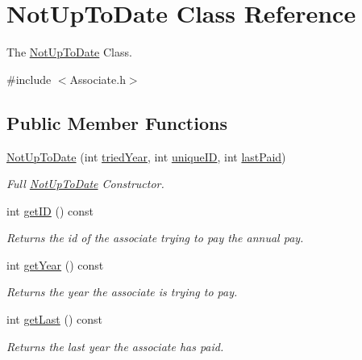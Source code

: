 \hypertarget{classNotUpToDate}{}\section{Not\+Up\+To\+Date Class Reference}
\label{classNotUpToDate}


The \hyperlink{classNotUpToDate}{Not\+Up\+To\+Date} Class.  




{\ttfamily \#include $<$Associate.\+h$>$}

\subsection*{Public Member Functions}
\begin{DoxyCompactItemize}
\item 
\hyperlink{classNotUpToDate_a61d903e6816ad8d5f5b496a72047df45}{Not\+Up\+To\+Date} (int \hyperlink{classNotUpToDate_a5e44159542e23d8ad12aba8768bd3350}{tried\+Year}, int \hyperlink{classNotUpToDate_afa612d29a846c1e7b679fbb069035a72}{unique\+ID}, int \hyperlink{classNotUpToDate_a728feda5151336575cd80a9b52a7a7d3}{last\+Paid})
\begin{DoxyCompactList}\small\item\em Full \hyperlink{classNotUpToDate}{Not\+Up\+To\+Date} Constructor. \end{DoxyCompactList}\item 
int \hyperlink{classNotUpToDate_aa0ee44392c77d24e7bb7a2096a940f0e}{get\+ID} () const
\begin{DoxyCompactList}\small\item\em Returns the id of the associate trying to pay the annual pay. \end{DoxyCompactList}\item 
int \hyperlink{classNotUpToDate_aab8122c1a325a895df70ebf25cf1918d}{get\+Year} () const
\begin{DoxyCompactList}\small\item\em Returns the year the associate is trying to pay. \end{DoxyCompactList}\item 
int \hyperlink{classNotUpToDate_a5aaa486e2e8cd13688e57d4e58096cab}{get\+Last} () const
\begin{DoxyCompactList}\small\item\em Returns the last year the associate has paid. \end{DoxyCompactList}\end{DoxyCompactItemize}
